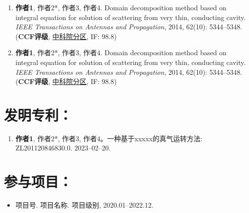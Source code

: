 \documentclass[print, doctor, vlined]{DissertUESTC}
\begin{document}
	\begin{enumerate}
	    \item \textbf{作者1}, 作者2*, 作者3, 作者4. Domain decomposition method based on integral equation for solution of scattering from very thin, conducting cavity. \emph{IEEE Transactions on Antennas and Propagation}, 2014, 62(10): 5344--5348. (\textbf{CCF评级}, \underline{中科院分区}, IF: 98.8)
	    
		\setcounter{enumi}{98}
	    
		\item \textbf{作者1}, 作者2*, 作者3, 作者4. Domain decomposition method based on integral equation for solution of scattering from very thin, conducting cavity. \emph{IEEE Transactions on Antennas and Propagation}, 2014, 62(10): 5344--5348. (\textbf{CCF评级}, \underline{中科院分区}, IF: 98.8)
	\end{enumerate}
	
	\section*{发明专利：}
	

	\begin{enumerate}
		
		\item \textbf{作者1}, 作者2*, 作者3, 作者4。一种基于xxxxx的真气运转方法: ZL201120846830.0. 2023--02--20.
		
	\end{enumerate}
	
	\section*{参与项目：}
	
	\begin{itemize}
		\item 项目号. 项目名称. 项目级别, 2020.01--2022.12.
	\end{itemize}
\end{document}
